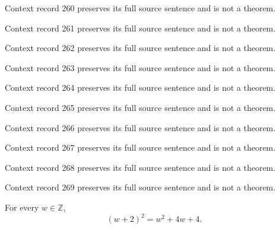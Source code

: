 \documentclass{article}
\begin{document}
\begin{remark}\label{train:context:260}Context record 260 preserves its full source sentence and is not a theorem.\end{remark}
\begin{remark}\label{train:context:261}Context record 261 preserves its full source sentence and is not a theorem.\end{remark}
\begin{remark}\label{train:context:262}Context record 262 preserves its full source sentence and is not a theorem.\end{remark}
\begin{remark}\label{train:context:263}Context record 263 preserves its full source sentence and is not a theorem.\end{remark}
\begin{remark}\label{train:context:264}Context record 264 preserves its full source sentence and is not a theorem.\end{remark}
\begin{remark}\label{train:context:265}Context record 265 preserves its full source sentence and is not a theorem.\end{remark}
\begin{remark}\label{train:context:266}Context record 266 preserves its full source sentence and is not a theorem.\end{remark}
\begin{remark}\label{train:context:267}Context record 267 preserves its full source sentence and is not a theorem.\end{remark}
\begin{remark}\label{train:context:268}Context record 268 preserves its full source sentence and is not a theorem.\end{remark}
\begin{remark}\label{train:context:269}Context record 269 preserves its full source sentence and is not a theorem.\end{remark}
\begin{theorem}\label{train:long}For every $w\in\mathbb{Z}$,\[(w+2)^2=w^2+4w+4.\]\end{theorem}
\end{document}
